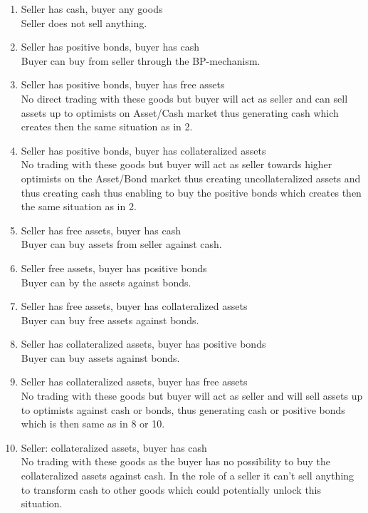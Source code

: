 \documentclass[Bachelorarbeit.tex]{subfiles}
\begin{document}
\begin{enumerate}
\item Seller has cash, buyer any goods \\ Seller does not sell anything. 
\item Seller has positive bonds, buyer has cash \\ Buyer can buy from seller through the BP-mechanism.
\item Seller has positive bonds, buyer has free assets \\ No direct trading with these goods but buyer will act as seller and can sell assets up to optimists on Asset/Cash market thus generating cash which creates then the same situation as in 2.
\item Seller has positive bonds, buyer has collateralized assets \\ No trading with these goods but buyer will act as seller towards higher optimists on the Asset/Bond market thus creating uncollateralized assets and thus creating cash thus enabling to buy the positive bonds which creates then the same situation as in 2.
\item Seller has free assets, buyer has cash \\ Buyer can buy assets from seller against cash.
\item Seller free assets, buyer has positive bonds \\ Buyer can by the assets against bonds.
\item Seller has free assets, buyer has collateralized assets \\ Buyer can buy free assets against bonds.
\item Seller has collateralized assets, buyer has positive bonds \\ Buyer can buy assets against bonds.
\item Seller has collateralized assets, buyer has free assets \\ No trading with these goods but buyer will act as seller and will sell assets up to optimists against cash or bonds, thus generating cash or positive bonds which is then same as in 8 or 10.
\item Seller: collateralized assets, buyer has cash \\ No trading with these goods as the buyer has no possibility to buy the collateralized assets against cash. In the role of a seller it can't sell anything to transform cash to other goods which could potentially unlock this situation.
\end{enumerate}
\end{document}
